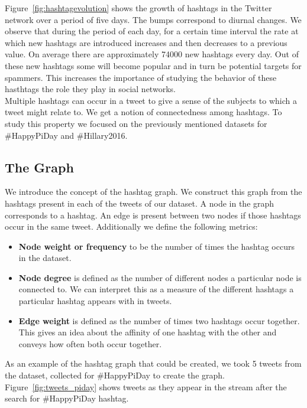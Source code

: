 \documentclass[journal, a4paper, 12pt]{article}
\begin{document}
Figure~\ref{fig:hashtagevolution} shows the growth of hashtags in the Twitter network over a period of five days. The bumps correspond to diurnal changes. We observe that during the period of each day, for a certain time interval the rate at which new hashtags are introduced increases and then decreases to a previous value. On average there are approximately 74000 new hashtags every day. Out of these new hashtags some will become popular and in turn be potential targets for spammers. This increases the importance of studying the behavior of these hasthtags the role they play in social networks. \\

Multiple hashtags can occur in a tweet to give a sense of the subjects to which a tweet might relate to. We get a notion of connectedness among hashtags. To study this property we focused on the previously mentioned datasets for \#HappyPiDay and \#Hillary2016.


\subsection{The Graph}
We introduce the concept of the hashtag graph. We construct this graph from the hashtags present in each of the tweets of our dataset. A node in the graph corresponds to a hashtag. An edge is present between two nodes if those hashtags occur in the same tweet. Additionally we define the following metrics:
\begin{itemize}
\item
\textbf{Node weight or frequency} to be the number of times the hashtag occurs in the dataset.
\item
\textbf{Node degree} is defined as the number of different nodes a particular node is connected to. We can interpret this as a measure of the different hashtags a particular hashtag appears with in tweets.
\item
\textbf{Edge weight} is defined as the number of times two hashtags occur together. This gives an idea about the affinity of one hashtag with the other and conveys how often both occur together.
\end{itemize}

As an example of the hashtag graph that could be created, we took 5 tweets from the dataset, collected for \#HappyPiDay to create the graph. Figure~\ref{fig:tweets_piday} shows tweets as they appear in the stream after the search for \#HappyPiDay hashtag.
\\
\end{document}
